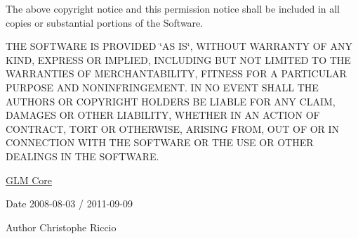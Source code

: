 The above copyright notice and this permission notice shall be included in all copies or substantial portions of the Software.

T\-H\-E S\-O\-F\-T\-W\-A\-R\-E I\-S P\-R\-O\-V\-I\-D\-E\-D \char`\"{}\-A\-S I\-S\char`\"{}, W\-I\-T\-H\-O\-U\-T W\-A\-R\-R\-A\-N\-T\-Y O\-F A\-N\-Y K\-I\-N\-D, E\-X\-P\-R\-E\-S\-S O\-R I\-M\-P\-L\-I\-E\-D, I\-N\-C\-L\-U\-D\-I\-N\-G B\-U\-T N\-O\-T L\-I\-M\-I\-T\-E\-D T\-O T\-H\-E W\-A\-R\-R\-A\-N\-T\-I\-E\-S O\-F M\-E\-R\-C\-H\-A\-N\-T\-A\-B\-I\-L\-I\-T\-Y, F\-I\-T\-N\-E\-S\-S F\-O\-R A P\-A\-R\-T\-I\-C\-U\-L\-A\-R P\-U\-R\-P\-O\-S\-E A\-N\-D N\-O\-N\-I\-N\-F\-R\-I\-N\-G\-E\-M\-E\-N\-T. I\-N N\-O E\-V\-E\-N\-T S\-H\-A\-L\-L T\-H\-E A\-U\-T\-H\-O\-R\-S O\-R C\-O\-P\-Y\-R\-I\-G\-H\-T H\-O\-L\-D\-E\-R\-S B\-E L\-I\-A\-B\-L\-E F\-O\-R A\-N\-Y C\-L\-A\-I\-M, D\-A\-M\-A\-G\-E\-S O\-R O\-T\-H\-E\-R L\-I\-A\-B\-I\-L\-I\-T\-Y, W\-H\-E\-T\-H\-E\-R I\-N A\-N A\-C\-T\-I\-O\-N O\-F C\-O\-N\-T\-R\-A\-C\-T, T\-O\-R\-T O\-R O\-T\-H\-E\-R\-W\-I\-S\-E, A\-R\-I\-S\-I\-N\-G F\-R\-O\-M, O\-U\-T O\-F O\-R I\-N C\-O\-N\-N\-E\-C\-T\-I\-O\-N W\-I\-T\-H T\-H\-E S\-O\-F\-T\-W\-A\-R\-E O\-R T\-H\-E U\-S\-E O\-R O\-T\-H\-E\-R D\-E\-A\-L\-I\-N\-G\-S I\-N T\-H\-E S\-O\-F\-T\-W\-A\-R\-E.

\hyperlink{group__core}{G\-L\-M Core}

\begin{DoxyDate}{Date}
2008-\/08-\/03 / 2011-\/09-\/09 
\end{DoxyDate}
\begin{DoxyAuthor}{Author}
Christophe Riccio 
\end{DoxyAuthor}
